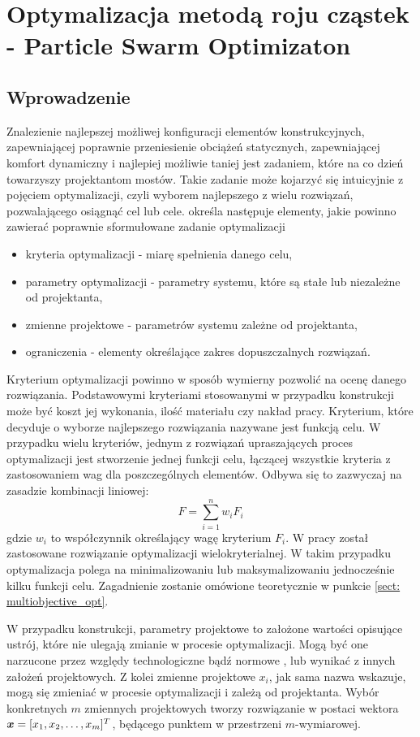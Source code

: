 \chapter{Optymalizacja metodą roju cząstek - Particle Swarm Optimizaton}
\section*{Wprowadzenie}
Znalezienie najlepszej możliwej konfiguracji elementów konstrukcyjnych, zapewniającej poprawnie przeniesienie obciążeń statycznych, zapewniającej komfort dynamiczny i najlepiej możliwie taniej jest zadaniem, które na co dzień towarzyszy projektantom mostów. Takie zadanie może kojarzyć się intuicyjnie z pojęciem optymalizacji, czyli wyborem najlepszego z wielu rozwiązań, pozwalającego osiągnąć cel lub cele. \cite{Szymczak1995} określa następuje elementy, jakie powinno zawierać poprawnie sformułowane zadanie optymalizacji
\begin{itemize}[noitemsep]
	\item kryteria optymalizacji - miarę spełnienia danego celu,
	\item parametry optymalizacji - parametry systemu, które są stałe lub niezależne od projektanta, 
	\item zmienne projektowe - parametrów systemu zależne od projektanta,
	\item ograniczenia - elementy określające zakres dopuszczalnych rozwiązań. 
\end{itemize}
Kryterium optymalizacji powinno w sposób wymierny pozwolić na ocenę danego rozwiązania. Podstawowymi kryteriami stosowanymi w przypadku konstrukcji może być koszt jej wykonania, ilość materiału czy nakład pracy. Kryterium, które decyduje o wyborze najlepszego rozwiązania nazywane jest funkcją celu. W przypadku wielu kryteriów, jednym z rozwiązań upraszających proces optymalizacji jest stworzenie jednej funkcji celu, łączącej wszystkie kryteria z zastosowaniem wag dla poszczególnych elementów. Odbywa się to zazwyczaj na zasadzie kombinacji liniowej:
\begin{equation}
	F=\sum_{i=1}^{n}w_i F_i
\end{equation}
gdzie $w_i$ to współczynnik określający wagę kryterium $F_i$. W pracy został zastosowane rozwiązanie optymalizacji wielokryterialnej. W takim przypadku optymalizacja polega na minimalizowaniu lub maksymalizowaniu jednocześnie kilku funkcji celu. Zagadnienie zostanie omówione teoretycznie w punkcie \ref{sect: multiobjective_opt}. 

W przypadku konstrukcji, parametry projektowe to założone wartości opisujące ustrój, które nie ulegają zmianie w procesie optymalizacji.  Mogą być one narzucone przez względy technologiczne bądź normowe \parencite{Szymczak1995}, lub wynikać z innych założeń projektowych. Z kolei zmienne projektowe $x_i$, jak sama nazwa wskazuje, mogą się zmieniać w procesie optymalizacji i zależą od projektanta. Wybór konkretnych $m$ zmiennych projektowych tworzy rozwiązanie w postaci wektora $\bm{x}=[x_1,x_2,\dots,x_m]^T$, będącego punktem w przestrzeni $m$-wymiarowej.

